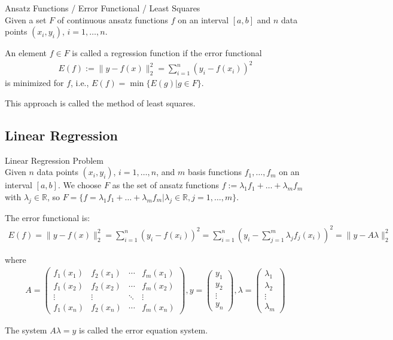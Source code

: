 \begin{definition}{Ansatz Functions / Error Functional / Least Squares}\\
Given a set $F$ of continuous ansatz functions $f$ on an interval $[a,b]$ and $n$ data points $(x_i, y_i)$, $i=1,\ldots,n$.

An element $f \in F$ is called a regression function if the error functional
\begin{align*}
E(f) := \|y - f(x)\|_2^2 = \sum_{i=1}^{n}(y_i - f(x_i))^2
\end{align*}
is minimized for $f$, i.e., $E(f) = \min\{E(g) | g \in F\}$.

This approach is called the method of least squares.
\end{definition}

\subsection{Linear Regression}

\begin{definition}{Linear Regression Problem}\\
Given $n$ data points $(x_i, y_i)$, $i=1,\ldots,n$, and $m$ basis functions $f_1,\ldots,f_m$ on an interval $[a,b]$. We choose $F$ as the set of ansatz functions $f := \lambda_1 f_1 + \ldots + \lambda_m f_m$ with $\lambda_j \in \mathbb{R}$, so $F = \{f = \lambda_1 f_1 + \ldots + \lambda_m f_m | \lambda_j \in \mathbb{R}, j=1,\ldots,m\}$.

The error functional is:
\begin{align*}
E(f) = \|y - f(x)\|_2^2 = \sum_{i=1}^{n}(y_i - f(x_i))^2 = \sum_{i=1}^{n}\left(y_i - \sum_{j=1}^{m}\lambda_j f_j(x_i)\right)^2 = \|y - A\lambda\|_2^2
\end{align*}

where
\begin{align*}
A = \begin{pmatrix}
f_1(x_1) & f_2(x_1) & \cdots & f_m(x_1)\\
f_1(x_2) & f_2(x_2) & \cdots & f_m(x_2)\\
\vdots & \vdots & \ddots & \vdots\\
f_1(x_n) & f_2(x_n) & \cdots & f_m(x_n)
\end{pmatrix},
y = \begin{pmatrix} y_1 \\ y_2 \\ \vdots \\ y_n \end{pmatrix},
\lambda = \begin{pmatrix} \lambda_1 \\ \lambda_2 \\ \vdots \\ \lambda_m \end{pmatrix}
\end{align*}

The system $A\lambda = y$ is called the error equation system.
\end{definition}

